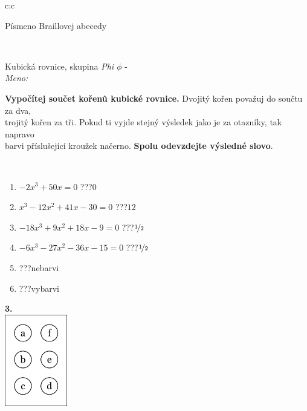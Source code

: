 \documentclass[10pt]{report}
\begin{document}
\begin{tabular}{c:c}
\begin{minipage}[c][104.5mm][t]{0.5\linewidth}
\begin{center}
\begin{minipage}{0.20\linewidth}
\begin{center}
{\small Písmeno Braillovej abecedy}
\end{center}
\end{minipage}
\end{center}
\end{minipage}
\\ \hdashline
\begin{minipage}[c][104.5mm][t]{0.5\linewidth}
\begin{center}
\vspace{7mm}
{\huge Kubická rovnice, skupina \textit{Phi $\phi$} -}\\[5mm]
\textit{Meno:}\phantom{xxxxxxxxxxxxxxxxxxxxxxxxxxxxxxxxxxxxxxxxxxxxxxxxxxxxxxxxxxxxxxxxx}\\[5mm]
\begin{minipage}{0.95\linewidth}
\textbf{Vypočítej součet kořenů kubické rovnice.} Dvojitý kořen považuj do součtu za dva,\\trojitý kořen za tři. Pokud ti vyjde stejný výsledek jako je za otazníky, tak napravo\\barvi příslušející kroužek načerno. \textbf{Spolu odevzdejte výsledné slovo}.
\end{minipage}
\\[1mm]
\begin{minipage}{0.79\linewidth}
\begin{center}
\begin{varwidth}{\linewidth}
\begin{enumerate}
\Large
\item $-2x^3+50x=0$\quad \dotfill\; ???\;\dotfill \quad $0$
\item $x^3-12x^2+41x-30=0$\quad \dotfill\; ???\;\dotfill \quad $12$
\item $-18x^3+9x^2+18x-9=0$\quad \dotfill\; ???\;\dotfill \quad $\nicefrac{1}{2}$
\item $-6x^3-27x^2-36x-15=0$\quad \dotfill\; ???\;\dotfill \quad $\nicefrac{1}{2}$
\item \quad \dotfill\; ???\;\dotfill \quad nebarvi
\item \quad \dotfill\; ???\;\dotfill \quad vybarvi
\end{enumerate}
\end{varwidth}
\end{center}
\end{minipage}
\begin{minipage}{0.20\linewidth}
\begin{center}
{\Huge\bfseries 3.} \\[2mm]
\includegraphics[height=40mm]{../images/braille.png}

\end{center}
\end{minipage}
\end{center}
\end{minipage}
\end{tabular}
\end{document}
